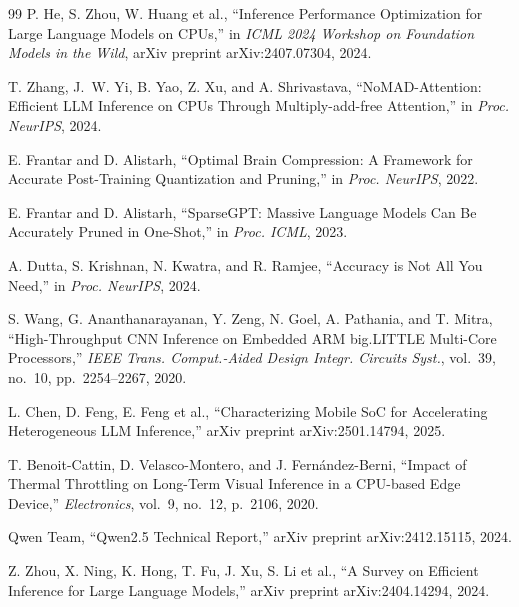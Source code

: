 \documentclass[conference]{IEEEtran}
\begin{document}
\begin{thebibliography}{99}
P. He, S. Zhou, W. Huang et al.,
``Inference Performance Optimization for Large Language Models on CPUs,''
in \textit{ICML 2024 Workshop on Foundation Models in the Wild},
arXiv preprint arXiv:2407.07304, 2024.

T. Zhang, J.~W. Yi, B. Yao, Z. Xu, and A. Shrivastava,
``NoMAD-Attention: Efficient LLM Inference on CPUs Through Multiply-add-free Attention,''
in \textit{Proc. NeurIPS}, 2024.

E. Frantar and D. Alistarh,
``Optimal Brain Compression: A Framework for Accurate Post-Training Quantization and Pruning,''
in \textit{Proc. NeurIPS}, 2022.

E. Frantar and D. Alistarh,
``SparseGPT: Massive Language Models Can Be Accurately Pruned in One-Shot,''
in \textit{Proc. ICML}, 2023.

A. Dutta, S. Krishnan, N. Kwatra, and R. Ramjee,
``Accuracy is Not All You Need,''
in \textit{Proc. NeurIPS}, 2024.

S. Wang, G. Ananthanarayanan, Y. Zeng, N. Goel, A. Pathania, and T. Mitra,
``High-Throughput CNN Inference on Embedded ARM big.LITTLE Multi-Core Processors,''
\textit{IEEE Trans. Comput.-Aided Design Integr. Circuits Syst.},
vol.~39, no.~10, pp.~2254--2267, 2020.

L. Chen, D. Feng, E. Feng et al.,
``Characterizing Mobile SoC for Accelerating Heterogeneous LLM Inference,''
arXiv preprint arXiv:2501.14794, 2025.

T. Benoit-Cattin, D. Velasco-Montero, and J. Fern{\'a}ndez-Berni,
``Impact of Thermal Throttling on Long-Term Visual Inference in a CPU-based Edge Device,''
\textit{Electronics}, vol.~9, no.~12, p.~2106, 2020.

Qwen Team,
``Qwen2.5 Technical Report,''
arXiv preprint arXiv:2412.15115, 2024.

Z. Zhou, X. Ning, K. Hong, T. Fu, J. Xu, S. Li et al.,
``A Survey on Efficient Inference for Large Language Models,''
arXiv preprint arXiv:2404.14294, 2024.

\end{thebibliography}

\end{document}

